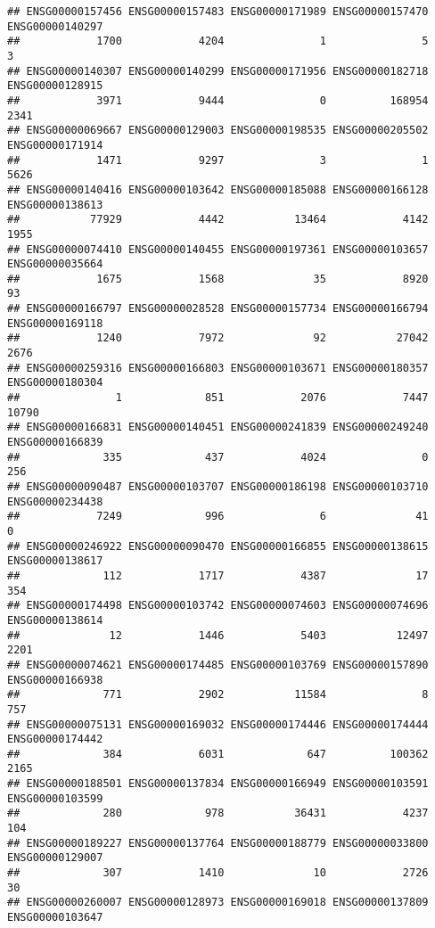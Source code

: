 \documentclass[
]{article}
\begin{document}
\begin{verbatim}
## ENSG00000157456 ENSG00000157483 ENSG00000171989 ENSG00000157470 ENSG00000140297 
##            1700            4204               1               5               3 
## ENSG00000140307 ENSG00000140299 ENSG00000171956 ENSG00000182718 ENSG00000128915 
##            3971            9444               0          168954            2341 
## ENSG00000069667 ENSG00000129003 ENSG00000198535 ENSG00000205502 ENSG00000171914 
##            1471            9297               3               1            5626 
## ENSG00000140416 ENSG00000103642 ENSG00000185088 ENSG00000166128 ENSG00000138613 
##           77929            4442           13464            4142            1955 
## ENSG00000074410 ENSG00000140455 ENSG00000197361 ENSG00000103657 ENSG00000035664 
##            1675            1568              35            8920              93 
## ENSG00000166797 ENSG00000028528 ENSG00000157734 ENSG00000166794 ENSG00000169118 
##            1240            7972              92           27042            2676 
## ENSG00000259316 ENSG00000166803 ENSG00000103671 ENSG00000180357 ENSG00000180304 
##               1             851            2076            7447           10790 
## ENSG00000166831 ENSG00000140451 ENSG00000241839 ENSG00000249240 ENSG00000166839 
##             335             437            4024               0             256 
## ENSG00000090487 ENSG00000103707 ENSG00000186198 ENSG00000103710 ENSG00000234438 
##            7249             996               6              41               0 
## ENSG00000246922 ENSG00000090470 ENSG00000166855 ENSG00000138615 ENSG00000138617 
##             112            1717            4387              17             354 
## ENSG00000174498 ENSG00000103742 ENSG00000074603 ENSG00000074696 ENSG00000138614 
##              12            1446            5403           12497            2201 
## ENSG00000074621 ENSG00000174485 ENSG00000103769 ENSG00000157890 ENSG00000166938 
##             771            2902           11584               8             757 
## ENSG00000075131 ENSG00000169032 ENSG00000174446 ENSG00000174444 ENSG00000174442 
##             384            6031             647          100362            2165 
## ENSG00000188501 ENSG00000137834 ENSG00000166949 ENSG00000103591 ENSG00000103599 
##             280             978           36431            4237             104 
## ENSG00000189227 ENSG00000137764 ENSG00000188779 ENSG00000033800 ENSG00000129007 
##             307            1410              10            2726              30 
## ENSG00000260007 ENSG00000128973 ENSG00000169018 ENSG00000137809 ENSG00000103647 

\end{verbatim}
\end{document}
